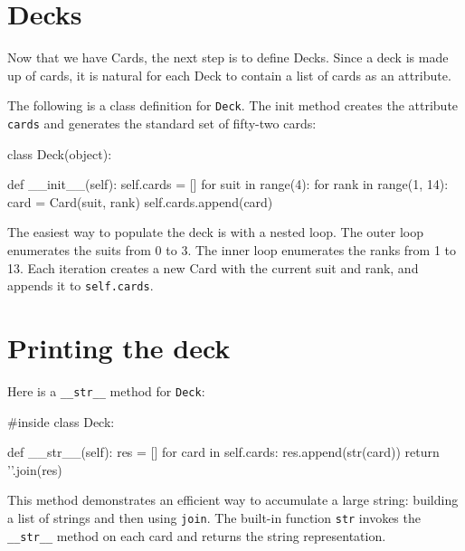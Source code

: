 \section{Decks}

Now that we have Cards, the next step is to define Decks.  Since a
deck is made up of cards, it is natural for each Deck to contain a
list of cards as an attribute.


The following is a class definition for {\tt Deck}.  The
init method creates the attribute {\tt cards} and generates
the standard set of fifty-two cards:



\beforeverb
\begin{pycode}
class Deck(object):

    def __init__(self):
        self.cards = []
        for suit in range(4):
            for rank in range(1, 14):
                card = Card(suit, rank)
                self.cards.append(card)
\end{pycode}
\afterverb
%
The easiest way to populate the deck is with a nested loop.  The outer
loop enumerates the suits from 0 to 3.  The inner loop enumerates the
ranks from 1 to 13.  Each iteration
creates a new Card with the current suit and rank,
and appends it to {\tt self.cards}.



\section{Printing the deck}
\label{printdeck}


Here is a \verb"__str__" method for {\tt Deck}:

\beforeverb
\begin{pycode}
#inside class Deck:

    def __str__(self):
        res = []
        for card in self.cards:
            res.append(str(card))
        return '\n'.join(res)
\end{pycode}
\afterverb
%
This method demonstrates an efficient way to accumulate a large
string: building a list of strings and then using {\tt join}.
The built-in function {\tt str} invokes the \verb"__str__"
method on each card and returns the string representation.

